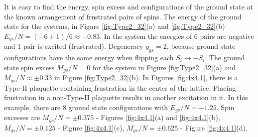 \documentclass[preprint,12pt]{elsarticle}
\begin{document}
	
	It is easy to find the energy, spin excess and configurations of the ground state at the known arrangement of frustrated pairs of spins. The energy of the ground state for the systems, in Figure \ref{fig:Type2_32}(a) and \ref{fig:Type2_32}(b) $E_{gs}/N=(-6+1)/6\approx-0.83$. In the system the energies of 6 pairs are negative and 1 pair is excited (frustrated). Degeneracy $g_{gs}=2$, because ground state configurations have the same energy when flipping each $S_i \rightarrow -S_i$. The ground state spin excess $M_{gs}/N=0$ for the system in Figure \ref{fig:Type2_32}(a) and $M_{gs}/N\approx\pm 0.33$ in Figure \ref{fig:Type2_32}(b).
	In Figures \ref{fig:4x4.1}, there is a Type-II plaquette containing frustration in the center of the lattice. Placing frustration in a non-Type-II plaquette results in another excitation in it. In this example, there are 8 ground state configurations with $E_{gs}/N=-1.25$. Spin excesses are $M_{gs}/N=\pm 0.375$ - Figures \ref{fig:4x4.1}(a) and \ref{fig:4x4.1}(b), $M_{gs}/N=\pm 0.125$ - Figure \ref{fig:4x4.1}(c), $M_{gs}/N=\pm 0.625$ - Figure \ref{fig:4x4.1}(d).
	
\end{document}
